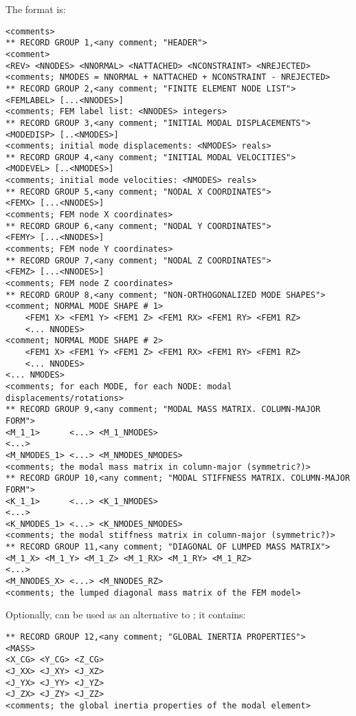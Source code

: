 The format is:
{\small
\begin{verbatim}
<comments>
** RECORD GROUP 1,<any comment; "HEADER">
<comment>
<REV> <NNODES> <NNORMAL> <NATTACHED> <NCONSTRAINT> <NREJECTED>
<comments; NMODES = NNORMAL + NATTACHED + NCONSTRAINT - NREJECTED>
** RECORD GROUP 2,<any comment; "FINITE ELEMENT NODE LIST">
<FEMLABEL> [...<NNODES>]
<comments; FEM label list: <NNODES> integers>
** RECORD GROUP 3,<any comment; "INITIAL MODAL DISPLACEMENTS">
<MODEDISP> [..<NMODES>]
<comments; initial mode displacements: <NMODES> reals>
** RECORD GROUP 4,<any comment; "INITIAL MODAL VELOCITIES">
<MODEVEL> [..<NMODES>]
<comments; initial mode velocities: <NMODES> reals>
** RECORD GROUP 5,<any comment; "NODAL X COORDINATES">
<FEMX> [...<NNODES>]
<comments; FEM node X coordinates>
** RECORD GROUP 6,<any comment; "NODAL Y COORDINATES">
<FEMY> [...<NNODES>]
<comments; FEM node Y coordinates>
** RECORD GROUP 7,<any comment; "NODAL Z COORDINATES">
<FEMZ> [...<NNODES>]
<comments; FEM node Z coordinates>
** RECORD GROUP 8,<any comment; "NON-ORTHOGONALIZED MODE SHAPES">
<comment; NORMAL MODE SHAPE # 1>
    <FEM1 X> <FEM1 Y> <FEM1 Z> <FEM1 RX> <FEM1 RY> <FEM1 RZ>
    <... NNODES>
<comment; NORMAL MODE SHAPE # 2>
    <FEM1 X> <FEM1 Y> <FEM1 Z> <FEM1 RX> <FEM1 RY> <FEM1 RZ>
    <... NNODES>
<... NMODES>
<comments; for each MODE, for each NODE: modal displacements/rotations>
** RECORD GROUP 9,<any comment; "MODAL MASS MATRIX. COLUMN-MAJOR FORM">
<M_1_1>      <...> <M_1_NMODES>
<...>
<M_NMODES_1> <...> <M_NMODES_NMODES>
<comments; the modal mass matrix in column-major (symmetric?)>
** RECORD GROUP 10,<any comment; "MODAL STIFFNESS MATRIX. COLUMN-MAJOR FORM">
<K_1_1>      <...> <K_1_NMODES>
<...>
<K_NMODES_1> <...> <K_NMODES_NMODES>
<comments; the modal stiffness matrix in column-major (symmetric?)>
** RECORD GROUP 11,<any comment; "DIAGONAL OF LUMPED MASS MATRIX">
<M_1_X> <M_1_Y> <M_1_Z> <M_1_RX> <M_1_RY> <M_1_RZ>
<...>
<M_NNODES_X> <...> <M_NNODES_RZ>
<comments; the lumped diagonal mass matrix of the FEM model>
\end{verbatim}
}

Optionally,  can be used as an alternative
to ; it contains:
{\small
\begin{verbatim}
** RECORD GROUP 12,<any comment; "GLOBAL INERTIA PROPERTIES">
<MASS>
<X_CG> <Y_CG> <Z_CG>
<J_XX> <J_XY> <J_XZ>
<J_YX> <J_YY> <J_YZ>
<J_ZX> <J_ZY> <J_ZZ>
<comments; the global inertia properties of the modal element>
\end{verbatim}
}

